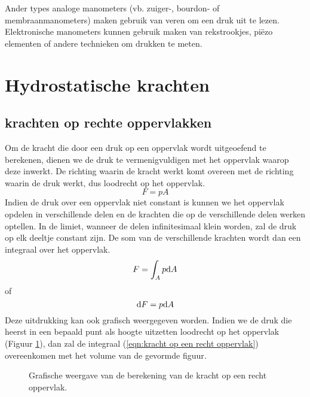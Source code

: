 Ander types analoge manometers (vb. zuiger-, bourdon- of membraanmanometers) maken gebruik van veren om een druk uit te lezen. Elektronische manometers kunnen gebruik maken van rekstrookjes, piëzo elementen of andere technieken om drukken te meten.

	\section{Hydrostatische krachten}
	\label{sec:Hydrostatische krachten}

		\subsection{krachten op rechte oppervlakken}
Om de kracht die door een druk op een oppervlak wordt uitgeoefend te berekenen, dienen we de druk te vermenigvuldigen met het oppervlak waarop deze inwerkt. De richting waarin de kracht werkt komt overeen met de richting waarin de druk werkt, dus loodrecht op het oppervlak.
\begin{equation}
	F = p A
\end{equation}
Indien de druk over een oppervlak niet constant is kunnen we het oppervlak opdelen in verschillende delen en de krachten die op de verschillende delen werken optellen. In de limiet, wanneer de delen infinitesimaal klein worden, zal de druk op elk deeltje constant zijn. De som van de verschillende krachten wordt dan een integraal over het oppervlak.
\begin{equation}
	F = \int_A p \mathrm{d} A
	\label{eqn:kracht op een recht oppervlak}
\end{equation}
of
\begin{equation}
	\mathrm{d} F = p \mathrm{d} A
\end{equation}
Deze uitdrukking kan ook grafisch weergegeven worden. Indien we de druk die heerst in een bepaald punt als hoogte uitzetten loodrecht op het oppervlak (Figuur \ref{fig:grafiche_weergave_integraal}), dan zal de integraal (\ref{eqn:kracht op een recht oppervlak}) overeenkomen met het volume van de gevormde figuur.

\begin{figure}[htb]
	\centering
	
	\caption{Grafische weergave van de berekening van de kracht op een recht oppervlak.}
	\label{fig:grafiche_weergave_integraal}
\end{figure}

